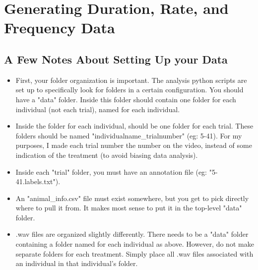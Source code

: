 \documentclass[11 pt]{article}
\begin{document}
\section{Generating Duration, Rate, and Frequency Data}
\subsection{A Few Notes About Setting Up your Data}
\begin{itemize}
\item First, your folder organization is important.  The analysis python scripts are set up to specifically look for folders in a certain configuration.  You should have a "data" folder.  Inside this folder should contain one folder for each individual (not each trial), named for each individual.
\item Inside the folder for each individual, should be one folder for each trial.  These folders should be named "individualname\_trialnumber" (eg: 5-41).  For my purposes, I made each trial number the number on the video, instead of some indication of the treatment (to avoid biasing data analysis).
\item Inside each "trial" folder, you must have an annotation file (eg: "5-41.labels.txt").
\item An "animal\_info.csv" file must exist somewhere, but you get to pick directly where to pull it from.  It makes most sense to put it in the top-level "data" folder.  
\item .wav files are organized slightly differently.  There needs to be a "data" folder containing a folder named for each individual as above.  However, do not make separate folders for each treatment.  Simply place all .wav files associated with an individual in that individual's folder.
\end{itemize}
\end{document}
